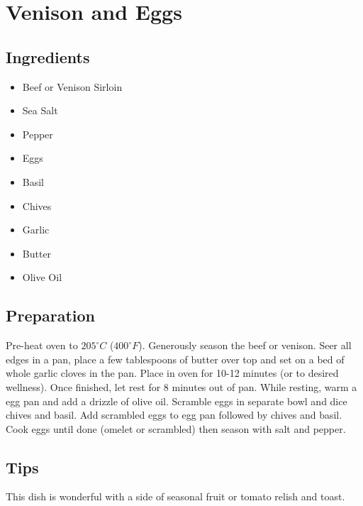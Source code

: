 \thispagestyle{fancy}
\section{Venison and Eggs}
\AddToShipoutPicture*{\SteakAndEggs}

\subsection*{Ingredients}
\begin{multicols}{3}
	\begin{itemize}
		\item Beef or Venison Sirloin
		\item Sea Salt
		\item Pepper
		\item Eggs
		\item Basil
		\item Chives
		\item Garlic
		\item Butter
		\item Olive Oil
	\end{itemize}
\end{multicols}

\subsection*{Preparation}

Pre-heat oven to $205^\circ C$ ($400^\circ F$). Generously season the beef or venison. Seer all edges in a pan, place a few tablespoons of butter over top and set on a bed of whole garlic cloves in the pan. Place in oven for 10-12 minutes (or to desired wellness). Once finished, let rest for 8 minutes out of pan. While resting, warm a egg pan and add a drizzle of olive oil. Scramble eggs in separate bowl and dice chives and basil. Add scrambled eggs to egg pan followed by chives and basil. Cook eggs until done (omelet or scrambled) then season with salt and pepper. 

\subsection*{Tips}

This dish is wonderful with a side of seasonal fruit or tomato relish and toast.